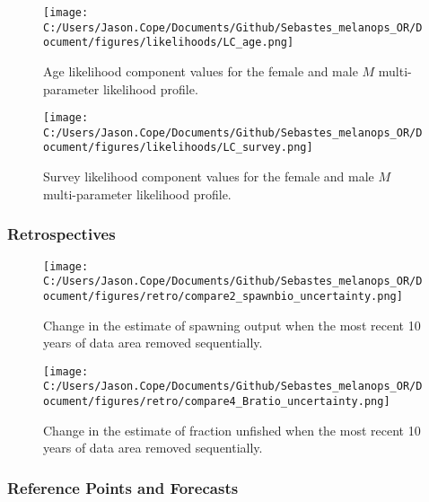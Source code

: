 \documentclass[11pt,
  english,
  letterpaper,
]{article}
\begin{document}
\newpage

\begin{figure}
\centering
\texttt{[image: C:/Users/Jason.Cope/Documents/Github/Sebastes\_melanops\_OR/Document/figures/likelihoods/LC\_age.png]}
\caption{Age likelihood component values for the female and male \(M\) multi-parameter likelihood profile.\label{fig:M-multiprofile-age-components}}
\end{figure}

\newpage

\begin{figure}
\centering
\texttt{[image: C:/Users/Jason.Cope/Documents/Github/Sebastes\_melanops\_OR/Document/figures/likelihoods/LC\_survey.png]}
\caption{Survey likelihood component values for the female and male \(M\) multi-parameter likelihood profile.\label{fig:M-multiprofile-survey-components}}
\end{figure}

\newpage

\hypertarget{retrospectives}{%
\subsubsection{Retrospectives}\label{retrospectives}}

\begin{figure}
\centering
\texttt{[image: C:/Users/Jason.Cope/Documents/Github/Sebastes\_melanops\_OR/Document/figures/retro/compare2\_spawnbio\_uncertainty.png]}
\caption{Change in the estimate of spawning output when the most recent 10 years of data area removed sequentially.\label{fig:retro-ssb}}
\end{figure}

\newpage

\begin{figure}
\centering
\texttt{[image: C:/Users/Jason.Cope/Documents/Github/Sebastes\_melanops\_OR/Document/figures/retro/compare4\_Bratio\_uncertainty.png]}
\caption{Change in the estimate of fraction unfished when the most recent 10 years of data area removed sequentially.\label{fig:retro-depl}}
\end{figure}

\newpage

\hypertarget{reference-points-and-forecasts}{%
\subsubsection{Reference Points and Forecasts}\label{reference-points-and-forecasts}}
\end{document}

